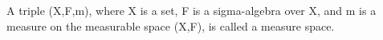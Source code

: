 A triple (X,F,m), where X is a set, F is a sigma-algebra over
X, and m is a measure on the measurable space (X,F), is
called a measure space.
